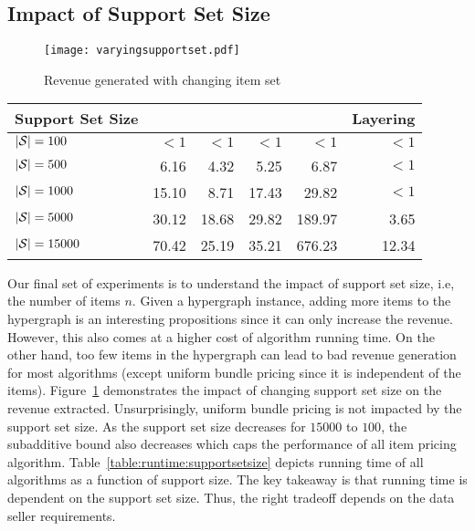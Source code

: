 \subsection{Impact of Support Set Size}


\begin{figure}[!t]
	\centering
	\texttt{[image: varyingsupportset.pdf]}
	\caption{Revenue generated with changing item set} \label{fig:supportsetsize}
\end{figure}  

\begin{table*}
	\begin{small}
		\begin{tabular}{@{}lrrrrr@{}}\toprule
			\textbf{Support Set Size} & \textbf{\lpip} & \textbf{\ubp} & \textbf{\uip} & \textbf{\cip} & \textbf{Layering}  \\ \midrule
			
			$|\mathcal{S}| = 100$ &  $<1$ & $<1$ & $<1$ & $<1$ & $<1$ \\ \hdashline
			$|\mathcal{S}| = 500$ &  6.16 & 4.32 &  5.25 & 6.87 & $<1$ \\ \hdashline
			$|\mathcal{S}| = 1000$ &  15.10 & 8.71 &  17.43 & 29.82 & $<1$ \\ \hdashline
			$|\mathcal{S}| = 5000$ &  30.12 & 18.68 &  29.82 & 189.97 & 3.65 \\ \hdashline
			$|\mathcal{S}| = 15000$ &  70.42 & 25.19 &  35.21 & 676.23 & 12.34 \\
			\bottomrule
		\end{tabular}
	\end{small}
	\caption{Algorithm running times (in seconds) for skewed workload}
	\label{table:runtime:supportsetsize}
\end{table*}

Our final set of experiments is to understand the impact of support set size, i.e, the number of items $n$. Given a hypergraph instance, adding more items to the hypergraph is an interesting propositions since it can only increase the revenue. However, this also comes at a higher cost of algorithm running time. On the other hand, too few items in the hypergraph can lead to bad revenue generation for most algorithms (except uniform bundle pricing since it is independent of the items). Figure~\ref{fig:supportsetsize} demonstrates the impact of changing support set size on the revenue extracted. Unsurprisingly, uniform bundle pricing is not impacted by the support set size. As the support set size decreases for $15000$ to $100$, the subadditive bound also decreases which caps the performance of all item pricing algorithm. Table~\ref{table:runtime:supportsetsize} depicts running time of all algorithms as a function of support size. The key takeaway is that running time is dependent on the support set size. Thus, the right tradeoff depends on the data seller requirements.

